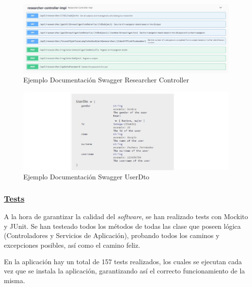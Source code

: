           \begin{figure}[h]
            \centering
            \includegraphics[width=1\textwidth]{images/swaggerendpoint.JPG}
            \caption{Ejemplo Documentación Swagger Researcher Controller}
        \end{figure}
        
        \begin{figure}[h]
            \centering
            \includegraphics[width=1\textwidth]{images/swaggeruserdto.JPG}
            \caption{Ejemplo Documentación Swagger UserDto}
        \end{figure}
        
        \FloatBarrier
        
        
        \subsubsection{\underline{Tests}}
        A la hora de garantizar la calidad del \textit{software}, se han realizado tests con Mockito y JUnit. Se han testeado todos los métodos de todas las clase que poseen lógica (Controladores y Servicios de Aplicación), probando todos los caminos y excepciones posibles, así como el camino feliz.
        \newline
        
        En la aplicación hay un total de 157 tests realizados, los cuales se ejecutan cada vez que se instala la aplicación, garantizando así el correcto funcionamiento de la misma.
        \newline
        
